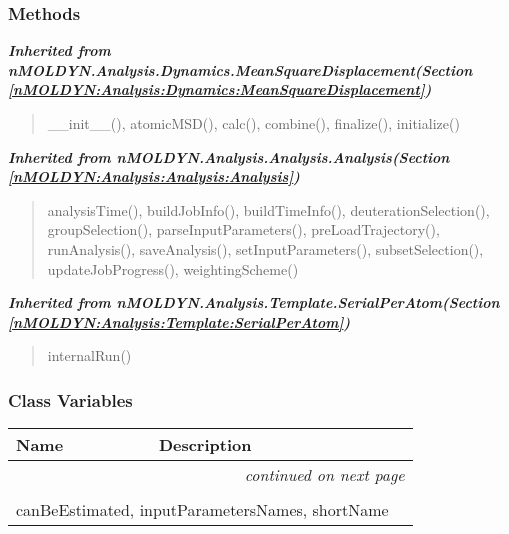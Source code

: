   \subsubsection{Methods}


\large{\textbf{\textit{Inherited from nMOLDYN.Analysis.Dynamics.MeanSquareDisplacement\textit{(Section \ref{nMOLDYN:Analysis:Dynamics:MeanSquareDisplacement})}}}}

\begin{quote}
\_\_init\_\_(), atomicMSD(), calc(), combine(), finalize(), initialize()
\end{quote}

\large{\textbf{\textit{Inherited from nMOLDYN.Analysis.Analysis.Analysis\textit{(Section \ref{nMOLDYN:Analysis:Analysis:Analysis})}}}}

\begin{quote}
analysisTime(), buildJobInfo(), buildTimeInfo(), deuterationSelection(), groupSelection(), parseInputParameters(), preLoadTrajectory(), runAnalysis(), saveAnalysis(), setInputParameters(), subsetSelection(), updateJobProgress(), weightingScheme()
\end{quote}

\large{\textbf{\textit{Inherited from nMOLDYN.Analysis.Template.SerialPerAtom\textit{(Section \ref{nMOLDYN:Analysis:Template:SerialPerAtom})}}}}

\begin{quote}
internalRun()
\end{quote}


  \subsubsection{Class Variables}

    \vspace{-1cm}
\hspace{\varindent}\begin{longtable}{|p{\varnamewidth}|p{\vardescrwidth}|l}
\cline{1-2}
\cline{1-2} \centering \textbf{Name} & \centering \textbf{Description}& \\
\cline{1-2}
\endhead\cline{1-2}\multicolumn{3}{r}{\small\textit{continued on next page}}\\\endfoot\cline{1-2}
\endlastfoot\multicolumn{2}{|l|}{\textit{Inherited from nMOLDYN.Analysis.Dynamics.MeanSquareDisplacement \textit{(Section \ref{nMOLDYN:Analysis:Dynamics:MeanSquareDisplacement})}}}\\
\multicolumn{2}{|p{\varwidth}|}{\raggedright canBeEstimated, inputParametersNames, shortName}\\
\cline{1-2}
\end{longtable}

